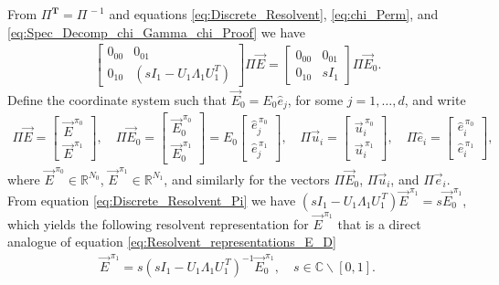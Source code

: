 \documentclass{cmslatex}
\newcommand{\T}{\mathbf{T}}
\begin{document}
From $\Pi^{\T}=\Pi^{\,-1}$ and equations \eqref{eq:Discrete_Resolvent},
\eqref{eq:chi_Perm}, and \eqref{eq:Spec_Decomp_chi_Gamma_chi_Proof} we
have 
%
\begin{align}\label{eq:Discrete_Resolvent_Pi}
  \left[
  \begin{array}{ccc}
    0_{00}&0_{01}\\
    0_{10}&(sI_1-U_1\Lambda_1U_1^T)
    \end{array}
\right]
\Pi\vec{E}
=
\left[
  \begin{array}{ccc}
    0_{00}&0_{01}\\
    0_{10}&sI_1
    \end{array}
\right]
\Pi\vec{E}_0.
\end{align}
%
Define the coordinate system such that $\vec{E}_0=E_0\hat{e}_j$, for
some $j=1,\ldots,d$, and write 
%
\begin{align}\label{Pi_coordinates_E}
  \Pi\vec{E}=
  \left[
  \begin{array}{ccc}
    \vec{E}^{\,\pi_0}\\ 
    \vec{E}^{\,\pi_1}
    \end{array}
\right],
\quad
 \Pi\vec{E}_0=
  \left[
  \begin{array}{ccc}
    \vec{E}_0^{\,\pi_0}\\
    \vec{E}_0^{\,\pi_1}
    \end{array}
\right]
=
E_0
\left[
  \begin{array}{ccc}
    \hat{e}_j^{\,\pi_0}\\
    \hat{e}_j^{\,\pi_1}
    \end{array}
\right],
\quad
 \Pi\vec{u}_i=
  \left[
  \begin{array}{ccc}
    \vec{u}_i^{\,\pi_0}\\
    \vec{u}_i^{\,\pi_1}
    \end{array}
\right],
\quad
\Pi\hat{e}_i=
  \left[
  \begin{array}{ccc}
    \hat{e}_i^{\,\pi_0}\\
    \hat{e}_i^{\,\pi_1}
    \end{array}
\right],
\end{align}
%
where $\vec{E}^{\,\pi_0}\in\mathbb{R}^{N_0}$,
$\vec{E}^{\,\pi_1}\in\mathbb{R}^{N_1}$, and similarly for the vectors
$\Pi\vec{E}_0$, $\Pi\vec{u}_i$, and $\Pi\vec{e}_i$. From equation
\eqref{eq:Discrete_Resolvent_Pi} we have
$(sI_1-U_1\Lambda_1U_1^{\,T})\vec{E}^{\,\pi_1}=s\vec{E}_0^{\,\pi_1}$, which
yields the following resolvent representation for $\vec{E}^{\,\pi_1}$
that is a direct analogue of equation
\eqref{eq:Resolvent_representations_E_D} 
%
\begin{align}\label{eq:Resolvent_representations_E_Pi}
  \vec{E}^{\,\pi_1}=s(sI_1-U_1\Lambda_1U_1^{\,T})^{-1}\vec{E}_0^{\,\pi_1}, \quad
  s\in\mathbb{C}\backslash[0,1].
\end{align}
%
\end{document}
